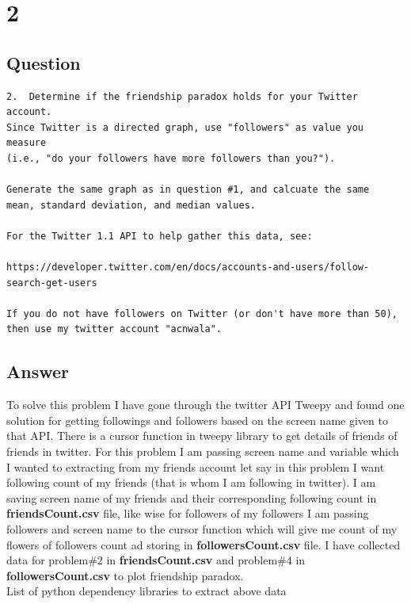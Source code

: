 \documentclass[letterpaper,11pt]{article}
\begin{document}
\clearpage


\section*{2}

\subsection*{Question}

\begin{verbatim}
2.  Determine if the friendship paradox holds for your Twitter account.
Since Twitter is a directed graph, use "followers" as value you measure
(i.e., "do your followers have more followers than you?").

Generate the same graph as in question #1, and calcuate the same 
mean, standard deviation, and median values.

For the Twitter 1.1 API to help gather this data, see:

https://developer.twitter.com/en/docs/accounts-and-users/follow-search-get-users

If you do not have followers on Twitter (or don't have more than 50),
then use my twitter account "acnwala".

\end{verbatim}

\clearpage
\subsection*{Answer}

To solve this problem I have gone through the twitter API Tweepy and found one solution for getting followings and followers based on the screen name given to that API. There is a cursor function in tweepy library  to get details of friends of friends in twitter. 
For this problem I am passing screen name and variable which I wanted to  extracting from my friends account let say  in this problem I want following count of  my friends (that is whom I am following in twitter).  I am saving screen name of my friends and their corresponding following count in \textbf{friendsCount.csv} file, like wise for followers of my followers I am passing followers and screen name to the cursor function which will give me count of my flowers of followers count ad storing in \textbf{followersCount.csv} file. I have collected data for problem\#2 in \textbf{friendsCount.csv} and problem\#4 in \textbf{followersCount.csv} to plot friendship paradox.\\
List of python dependency libraries to extract above data
\end{document}

